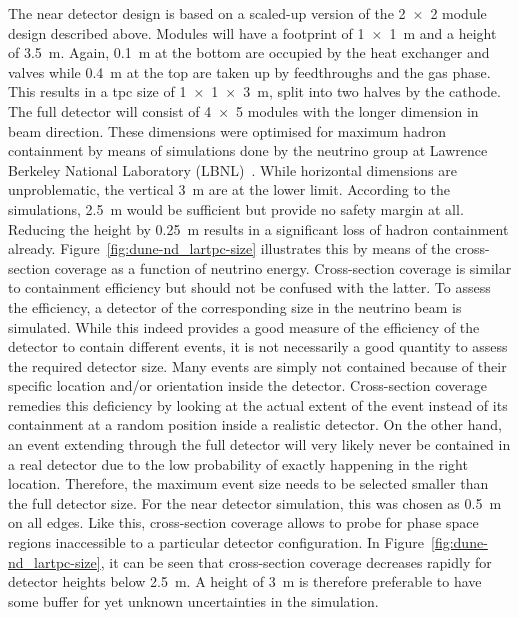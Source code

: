 The \AC{} near detector design is based on a scaled-up version of the \num{2 x 2} module design described above.
Modules will have a footprint of \SI{1 x 1}{\metre} and a height of \SI{3.5}{\metre}.
Again, \SI{0.1}{\metre} at the bottom are occupied by the heat exchanger and valves while \SI{0.4}{\metre} at the top are taken up by feedthroughs and the gas phase.
This results in a \gls{tpc} size of \SI{1 x 1 x 3}{\metre}, split into two halves by the cathode.
The full detector will consist of \num{4 x 5} modules with the longer dimension in beam direction.
These dimensions were optimised for maximum hadron containment by means of simulations done by the neutrino group at Lawrence Berkeley National Laboratory (LBNL)~\cite{lartpcSizeChris}.
While horizontal dimensions are unproblematic, the vertical \SI{3}{\metre} are at the lower limit.
According to the simulations, \SI{2.5}{\metre} would be sufficient but provide no safety margin at all.
Reducing the height by \SI{0.25}{\metre} results in a significant loss of hadron containment already.
Figure~\ref{fig:dune-nd_lartpc-size} illustrates this by means of the cross-section coverage as a function of neutrino energy.
Cross-section coverage is similar to containment efficiency but should not be confused with the latter.
To assess the efficiency, a detector of the corresponding size in the neutrino beam is simulated.
While this indeed provides a good measure of the efficiency of the detector to contain different events, it is not necessarily a good quantity to assess the required detector size.
Many events are simply not contained because of their specific location and/or orientation inside the detector.
Cross-section coverage remedies this deficiency by looking at the actual extent of the event instead of its containment at a random position inside a realistic detector.
On the other hand, an event extending through the full detector will very likely never be contained in a real detector due to the low probability of exactly happening in the right location.
Therefore, the maximum event size needs to be selected smaller than the full detector size.
For the near detector simulation, this was chosen as \SI{0.5}{\metre} on all edges.
Like this, cross-section coverage allows to probe for phase space regions inaccessible to a particular detector configuration.
In Figure~\ref{fig:dune-nd_lartpc-size}, it can be seen that cross-section coverage decreases rapidly for detector heights below \SI{2.5}{\metre}.
A height of \SI{3}{\metre} is therefore preferable to have some buffer for yet unknown uncertainties in the simulation.

